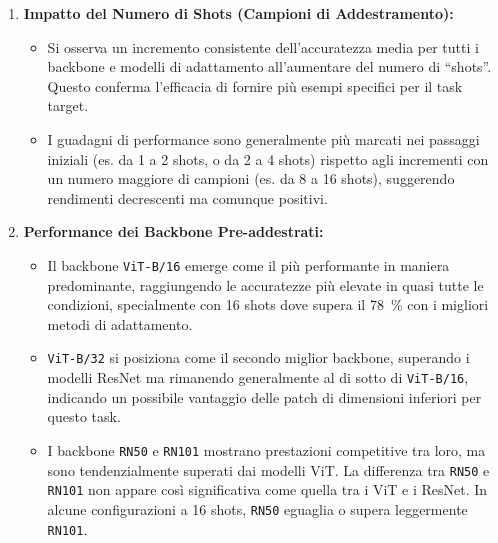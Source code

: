 \documentclass[11pt,a4paper]{article}
\begin{document}
\begin{enumerate}
    \item \textbf{Impatto del Numero di Shots (Campioni di Addestramento):}
    \begin{itemize}[label=\textbullet, leftmargin=*]
        \item Si osserva un incremento consistente dell'accuratezza media per tutti i backbone e modelli di adattamento all'aumentare del numero di ``shots''. Questo conferma l'efficacia di fornire più esempi specifici per il task target.
        \item I guadagni di performance sono generalmente più marcati nei passaggi iniziali (es. da 1 a 2 shots, o da 2 a 4 shots) rispetto agli incrementi con un numero maggiore di campioni (es. da 8 a 16 shots), suggerendo rendimenti decrescenti ma comunque positivi.
    \end{itemize}

    \item \textbf{Performance dei Backbone Pre-addestrati:}
    \begin{itemize}[label=\textbullet, leftmargin=*]
        \item Il backbone \texttt{ViT-B/16} emerge come il più performante in maniera predominante, raggiungendo le accuratezze più elevate in quasi tutte le condizioni, specialmente con 16 shots dove supera il \SI{78}{\percent} con i migliori metodi di adattamento.
        \item \texttt{ViT-B/32} si posiziona come il secondo miglior backbone, superando i modelli ResNet ma rimanendo generalmente al di sotto di \texttt{ViT-B/16}, indicando un possibile vantaggio delle patch di dimensioni inferiori per questo task.
        \item I backbone \texttt{RN50} e \texttt{RN101} mostrano prestazioni competitive tra loro, ma sono tendenzialmente superati dai modelli ViT. La differenza tra \texttt{RN50} e \texttt{RN101} non appare così significativa come quella tra i ViT e i ResNet. In alcune configurazioni a 16 shots, \texttt{RN50} eguaglia o supera leggermente \texttt{RN101}.
    \end{itemize}


\end{enumerate}
\end{document}
